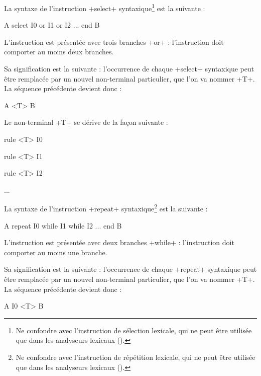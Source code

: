 
La syntaxe de l'instruction \ggs+select+ syntaxique\footnote{Ne confondre avec l'instruction de sélection lexicale, qui ne peut être utilisée que dans les analyseurs lexicaux ().} est la suivante :
\begin{galgascode}
A
select
  I0
or
  I1
or
  I2
...
end
B
\end{galgascode}

L'instruction est présentée avec trois branches \ggs+or+ : l'instruction doit comporter au moins deux branches.

Sa signification est la suivante : l'occurrence de chaque \ggs+select+ syntaxique peut être remplacée par un nouvel non-terminal particulier, que l'on va nommer \ggs+T+. La séquence précédente devient donc :
\begin{galgascode}
A
<T>
B
\end{galgascode}

Le non-terminal \ggs+T+ se dérive de la façon suivante :
\begin{galgascode}
rule <T> { I0 }

rule <T> { I1 }

rule <T> { I2 }

...
\end{galgascode}








La syntaxe de l'instruction \ggs+repeat+ syntaxique\footnote{Ne confondre avec l'instruction de répétition lexicale, qui ne peut être utilisée que dans les analyseurs lexicaux ().} est la suivante :
\begin{galgascode}
A
repeat
  I0
while
  I1
while
  I2
...
end
B
\end{galgascode}

L'instruction est présentée avec deux branches \ggs+while+ : l'instruction doit comporter au moins une branche.

Sa signification est la suivante : l'occurrence de chaque \ggs+repeat+ syntaxique peut être remplacée par un nouvel non-terminal particulier, que l'on va nommer \ggs+T+. La séquence précédente devient donc :
\begin{galgascode}
A
I0
<T>
B
\end{galgascode}

